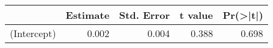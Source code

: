 
\begin{tabular}{l|r|r|r|r}
\hline
  & Estimate & Std. Error & t value & Pr(>|t|)\\
\hline
(Intercept) & 0.002 & 0.004 & 0.388 & 0.698\\
\hline
\end{tabular}
